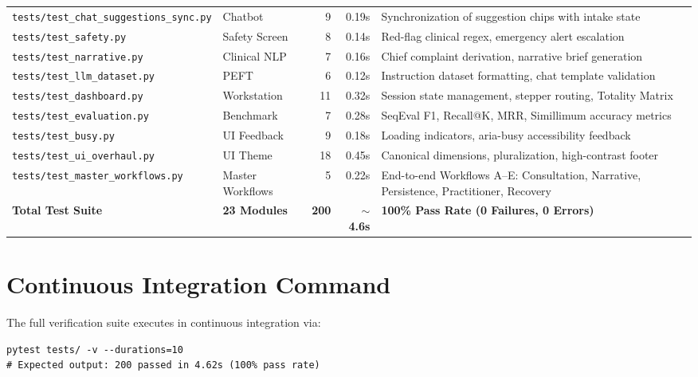 \begin{table}[H]
\begin{tabular}{llrrP{5.5cm}}
\texttt{tests/test\_chat\_suggestions\_sync.py} & Chatbot & 9 & 0.19s & Synchronization of suggestion chips with intake state \\
\texttt{tests/test\_safety.py} & Safety Screen & 8 & 0.14s & Red-flag clinical regex, emergency alert escalation \\
\texttt{tests/test\_narrative.py} & Clinical NLP & 7 & 0.16s & Chief complaint derivation, narrative brief generation \\
\texttt{tests/test\_llm\_dataset.py} & PEFT & 6 & 0.12s & Instruction dataset formatting, chat template validation \\
\texttt{tests/test\_dashboard.py} & Workstation & 11 & 0.32s & Session state management, stepper routing, Totality Matrix \\
\texttt{tests/test\_evaluation.py} & Benchmark & 7 & 0.28s & SeqEval F1, Recall@K, MRR, Simillimum accuracy metrics \\
\texttt{tests/test\_busy.py} & UI Feedback & 9 & 0.18s & Loading indicators, aria-busy accessibility feedback \\
\texttt{tests/test\_ui\_overhaul.py} & UI Theme & 18 & 0.45s & Canonical dimensions, pluralization, high-contrast footer \\
\texttt{tests/test\_master\_workflows.py} & Master Workflows & 5 & 0.22s & End-to-end Workflows A--E: Consultation, Narrative, Persistence, Practitioner, Recovery \\
\midrule
\textbf{Total Test Suite} & \textbf{23 Modules} & \textbf{200} & \textbf{$\sim$4.6s} & \textbf{100\% Pass Rate (0 Failures, 0 Errors)} \\
\bottomrule
\end{tabular}
\end{table}

\clearpage

\section{Continuous Integration Command}

The full verification suite executes in continuous integration via:

\begin{lstlisting}[style=python, caption={Test Suite Verification Command}]
pytest tests/ -v --durations=10
# Expected output: 200 passed in 4.62s (100% pass rate)
\end{lstlisting}
